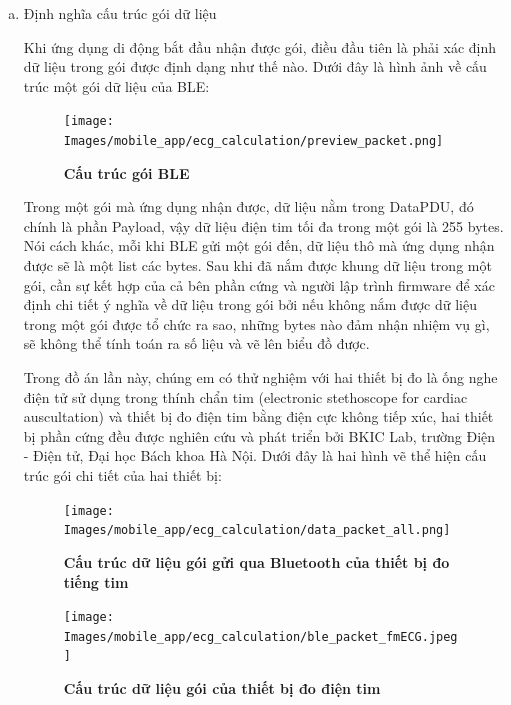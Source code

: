 \begin{enumerate} [a)]
  \item Định nghĩa cấu trúc gói dữ liệu

    Khi ứng dụng di động bắt đầu nhận được gói, điều đầu tiên là phải xác định dữ liệu trong gói được định dạng như thế nào.
    Dưới đây là hình ảnh về cấu trúc một gói dữ liệu của BLE:
    \begin{figure}[H]
      \centering
      \texttt{[image: Images/mobile\_app/ecg\_calculation/preview\_packet.png]}
      \caption[Cấu trúc gói BLE]{\bfseries \fontsize{12pt}{0pt}
      \selectfont Cấu trúc gói BLE}
      \label{preview_packet} %
    \end{figure}
    Trong một gói mà ứng dụng nhận được, dữ liệu nằm trong DataPDU, đó chính là phần Payload, vậy dữ liệu điện tim tối đa
    trong một gói là 255 bytes. Nói cách khác, mỗi khi BLE gửi một gói đến, dữ liệu thô mà ứng dụng nhận được sẽ là một
    list các bytes. Sau khi đã nắm được khung dữ liệu trong một gói, cần sự kết hợp của cả bên phần cứng 
    và người lập trình firmware để xác định chi tiết ý nghĩa về dữ liệu trong gói bởi nếu không nắm được dữ liệu
    trong một gói được tổ chức ra sao, những bytes nào đảm nhận nhiệm vụ gì, sẽ không thể tính toán ra số liệu và vẽ lên biểu
    đồ được.
    
    Trong đồ án lần này, chúng em có thử nghiệm với hai thiết bị đo là ống nghe điện tử sử dụng trong thính chẩn tim (electronic stethoscope for cardiac auscultation)
    và thiết bị đo điện tim bằng điện cực không tiếp xúc, hai thiết bị phần cứng đều được nghiên cứu và phát triển bởi BKIC Lab, trường Điện - Điện tử,
    Đại học Bách khoa Hà Nội. Dưới đây là hai hình vẽ thể hiện cấu trúc gói chi tiết của hai thiết bị:

    \begin{figure}[H]
      \centering
      \texttt{[image: Images/mobile\_app/ecg\_calculation/data\_packet\_all.png]}
      \caption[Cấu trúc dữ liệu gói gửi qua Bluetooth của thiết bị đo tiếng tim]{\bfseries \fontsize{12pt}{0pt}
      \selectfont Cấu trúc dữ liệu gói gửi qua Bluetooth của thiết bị đo tiếng tim}
      \label{data_packet_ecg}
    \end{figure}

    \begin{figure}[H]
      \centering
      \texttt{[image: Images/mobile\_app/ecg\_calculation/ble\_packet\_fmECG.jpeg]}
      \caption[Cấu trúc dữ liệu gói gửi qua Bluetooth của thiết bị đo điện tim]{\bfseries \fontsize{12pt}{0pt}
      \selectfont Cấu trúc dữ liệu gói của thiết bị đo điện tim}
      \label{ble_packet_fmECG}
    \end{figure}


\end{enumerate}
